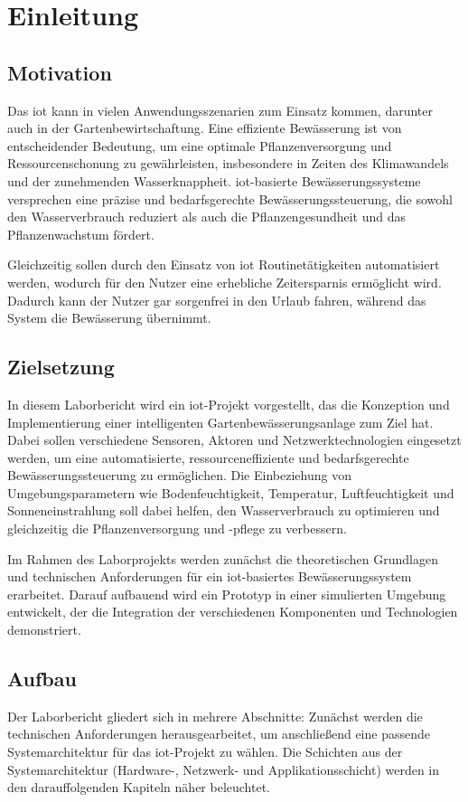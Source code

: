 
\section{Einleitung}

\subsection{Motivation}
Das \gls{iot} kann in vielen Anwendungsszenarien zum Einsatz kommen, darunter auch in der Gartenbewirtschaftung. Eine effiziente Bewässerung ist von entscheidender Bedeutung, um eine optimale Pflanzenversorgung und Ressourcenschonung zu gewährleisten, insbesondere in Zeiten des Klimawandels und der zunehmenden Wasserknappheit. \gls{iot}-basierte Bewässerungssysteme versprechen eine präzise und bedarfsgerechte Bewässerungssteuerung, die sowohl den Wasserverbrauch reduziert als auch die Pflanzengesundheit und das Pflanzenwachstum fördert.

Gleichzeitig sollen durch den Einsatz von \gls{iot} Routinetätigkeiten automatisiert werden, wodurch für den Nutzer eine erhebliche Zeitersparnis ermöglicht wird.
Dadurch kann der Nutzer gar sorgenfrei in den Urlaub fahren, während das System die Bewässerung übernimmt.

\subsection{Zielsetzung}

In diesem Laborbericht wird ein \gls{iot}-Projekt vorgestellt, das die Konzeption und Implementierung einer intelligenten Gartenbewässerungsanlage zum Ziel hat. Dabei sollen verschiedene Sensoren, Aktoren und Netzwerktechnologien eingesetzt werden, um eine automatisierte, ressourceneffiziente und bedarfsgerechte Bewässerungssteuerung zu ermöglichen. Die Einbeziehung von Umgebungsparametern wie Bodenfeuchtigkeit, Temperatur, Luftfeuchtigkeit und Sonneneinstrahlung soll dabei helfen, den Wasserverbrauch zu optimieren und gleichzeitig die Pflanzenversorgung und -pflege zu verbessern.

Im Rahmen des Laborprojekts werden zunächst die theoretischen Grundlagen und technischen Anforderungen für ein \gls{iot}-basiertes Bewässerungssystem erarbeitet. Darauf aufbauend wird ein Prototyp in einer simulierten Umgebung entwickelt, der die Integration der verschiedenen Komponenten und Technologien demonstriert.

\subsection{Aufbau}

Der Laborbericht gliedert sich in mehrere Abschnitte: Zunächst werden die technischen Anforderungen herausgearbeitet, um anschließend eine passende Systemarchitektur für das \gls{iot}-Projekt zu wählen.
Die Schichten aus der Systemarchitektur (Hardware-, Netzwerk- und Applikationsschicht) werden in den darauffolgenden Kapiteln näher beleuchtet.